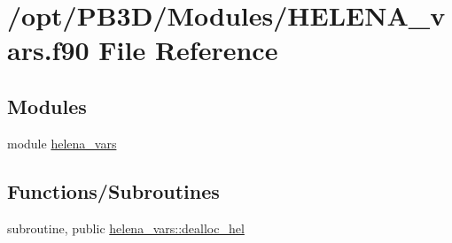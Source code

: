 \hypertarget{HELENA__vars_8f90}{}\section{/opt/\+P\+B3\+D/\+Modules/\+H\+E\+L\+E\+N\+A\+\_\+vars.f90 File Reference}
\label{HELENA__vars_8f90}
\subsection*{Modules}
\begin{DoxyCompactItemize}
\item 
module \hyperlink{namespacehelena__vars}{helena\+\_\+vars}
\end{DoxyCompactItemize}
\subsection*{Functions/\+Subroutines}
\begin{DoxyCompactItemize}
\item 
subroutine, public \hyperlink{namespacehelena__vars_add7b3eea7306eca7fb45737ff915523f}{helena\+\_\+vars\+::dealloc\+\_\+hel}
\end{DoxyCompactItemize}
